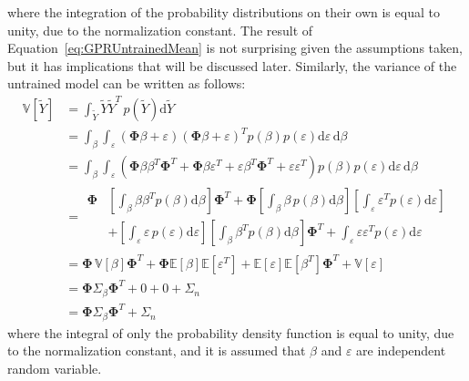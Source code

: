\documentclass{article}
\begin{document}
where the integration of the probability distributions on their own is equal to unity, due to the normalization constant. The result of Equation~\eqref{eq:GPRUntrainedMean} is not surprising given the assumptions taken, but it has implications that will be discussed later. Similarly, the variance of the untrained model can be written as follows:
\begin{equation}
\label{eq:GPRUntrainedVariance}
	\begin{aligned}
	\mathbb{V}\!\left[\widetilde{Y}\right] &= \int_{\widetilde{Y}} \widetilde{Y} \widetilde{Y}^T \, p\!\left(\widetilde{Y}\right) \text{d}\widetilde{Y} \\
	&= \int_{\beta} \int_{\varepsilon} \left(\mathbf{\Phi} \beta + \varepsilon\right) \left(\mathbf{\Phi} \beta + \varepsilon\right)^T p\!\left(\beta\right) p\!\left(\varepsilon\right) \text{d}\varepsilon \, \text{d}\beta \\
	&= \int_{\beta} \int_{\varepsilon} \left(\mathbf{\Phi} \beta \beta^T \mathbf{\Phi}^T + \mathbf{\Phi} \beta \varepsilon^T + \varepsilon \beta^T \mathbf{\Phi}^T + \varepsilon \varepsilon^T\right) p\!\left(\beta\right) p\!\left(\varepsilon\right) \text{d}\varepsilon \, \text{d}\beta \\
	&=
	\begin{split}
	 \mathbf{\Phi} &\left[\int_{\beta} \beta \beta^T p\!\left(\beta\right) \text{d}\beta\right] \mathbf{\Phi}^T + \mathbf{\Phi} \left[\int_{\beta} \beta \, p\!\left(\beta\right) \text{d}\beta\right] \left[\int_{\varepsilon} \varepsilon^T p\!\left(\varepsilon\right) \text{d}\varepsilon\right] \\
	&+ \left[\int_{\varepsilon} \varepsilon \, p\!\left(\varepsilon\right) \text{d}\varepsilon\right] \left[\int_{\beta} \beta^T p\!\left(\beta\right) \text{d}\beta\right] \mathbf{\Phi}^T + \int_{\varepsilon} \varepsilon \varepsilon^T p\!\left(\varepsilon\right) \text{d}\varepsilon
	\end{split}
	\\
	&= \mathbf{\Phi} \, \mathbb{V}\!\left[\beta\right] \mathbf{\Phi}^T + \mathbf{\Phi} \mathbb{E}\!\left[\beta\right] \mathbb{E}\left[\varepsilon^T\right] + \mathbb{E}\left[\varepsilon\right] \mathbb{E}\!\left[\beta^T\right] \mathbf{\Phi}^T + \mathbb{V}\!\left[\varepsilon\right] \\
	&= \mathbf{\Phi} \Sigma_\beta \mathbf{\Phi}^T + 0 + 0 + \Sigma_n \\
	&= \mathbf{\Phi} \Sigma_\beta \mathbf{\Phi}^T + \Sigma_n
	\end{aligned}
\end{equation}
where the integral of only the probability density function is equal to unity, due to the normalization constant, and it is assumed that $\beta$ and $\varepsilon$ are independent random variable.
\end{document}
